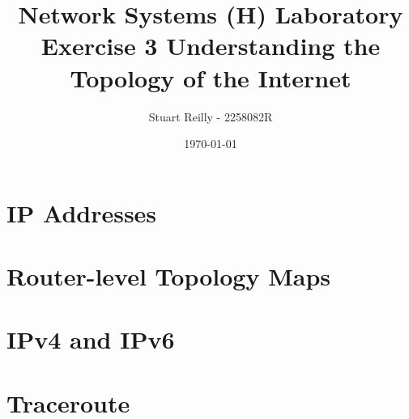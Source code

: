 \documentclass[11pt,a4paper]{article}
\begin{document}
    \title{Network Systems (H) Laboratory Exercise 3 Understanding the Topology of the Internet}
    \author{Stuart Reilly - 2258082R}
    \date{\today}
    \maketitle

    \section{IP Addresses}\label{sec:ip-addresses}

    \section{Router-level Topology Maps}\label{sec:router-level-topology-maps}

    \section{IPv4 and IPv6}\label{sec:ipv4-and-ipv6}

    \section{Traceroute}\label{sec:traceroute}
\end{document}
